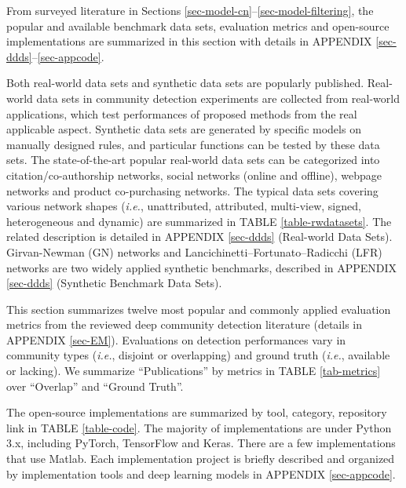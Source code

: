 \label{sec-experimentation} 
From surveyed literature in Sections \ref{sec-model-cn}--\ref{sec-model-filtering}, the popular and available benchmark data sets, evaluation metrics and open-source implementations are summarized in this section with details in APPENDIX \ref{sec-ddds}--\ref{sec-appcode}.

\label{sec-datasets}
Both real-world data sets and synthetic data sets are popularly published. Real-world data sets in community detection experiments are collected from real-world applications, which test performances of proposed methods from the real applicable aspect. Synthetic data sets are generated by specific models on manually designed rules, and particular functions can be tested by these data sets. The state-of-the-art popular real-world data sets can be categorized into citation/co-authorship networks, social networks (online and offline), webpage networks and product co-purchasing networks. The typical data sets covering various network shapes (\textit{i.e.}, unattributed, attributed, multi-view, signed, heterogeneous and dynamic) are summarized in TABLE \ref{table-rwdatasets}. The related description is detailed in APPENDIX \ref{sec-ddds} (Real-world Data Sets). Girvan-Newman (GN) networks  and Lancichinetti–Fortunato–Radicchi (LFR) networks  are two widely applied synthetic benchmarks, described in APPENDIX \ref{sec-ddds} (Synthetic Benchmark Data Sets).

\label{sec-metrics}
This section summarizes twelve most popular and commonly applied evaluation metrics from the reviewed deep community detection literature (details in APPENDIX \ref{sec-EM}). Evaluations on detection performances vary in community types (\textit{i.e.}, disjoint or overlapping) and ground truth (\textit{i.e.}, available or lacking). We summarize ``Publications'' by metrics in TABLE \ref{tab-metrics} over ``Overlap'' and ``Ground Truth''.

\label{sec-code}
The open-source implementations are summarized by tool, category, repository link in TABLE \ref{table-code}. The majority of implementations are under Python 3.x, including PyTorch, TensorFlow and Keras. There are a few implementations that use Matlab. Each implementation project is briefly described and organized by implementation tools and deep learning models in APPENDIX \ref{sec-appcode}.

